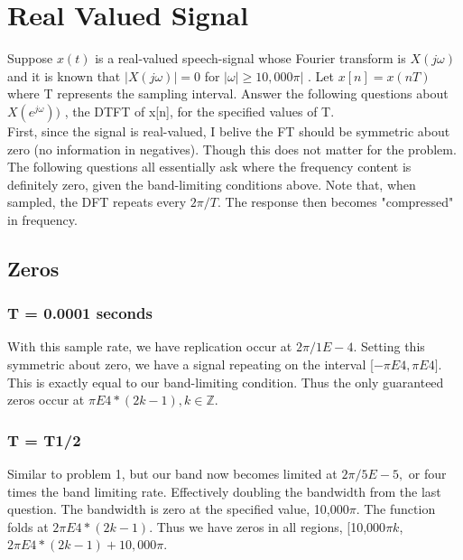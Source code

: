 

\maketitle
\section{Real Valued Signal}
Suppose	 $x(t)$ is	a	 real-valued	speech-signal	whose	Fourier	 transform	is	 $X ( j\omega)$ and	it	is	 known	 that	$| X ( j\omega)|= 0$ for	$|\omega | \geq 10,000\pi|$ .	 Let	 $x[n] = x(nT )$ where	 T	 represents	the	 sampling	 interval.	 Answer	 the	 following	 questions	 about	 $X (e^{j\omega}) )$ ,	 the	 DTFT	 of	 x[n],	for	the	specified	values	of	T.\\[0.1in]
First, since the signal is real-valued, I belive the FT should be symmetric about zero (no information in negatives). Though this does not matter for the problem. \\[0.1in]
The following questions all essentially ask where the frequency content is definitely zero, given the band-limiting conditions above. Note that, when sampled, the DFT repeats every $2\pi/T$. The response then becomes "compressed" in frequency. 
\subsection{Zeros}
\subsubsection{T = 0.0001 seconds}	
With this sample rate, we have replication occur at $2\pi / 1E-4$. Setting this symmetric about zero, we have a signal repeating on the interval [$-\pi E4, \pi E4].$ This is exactly equal to our band-limiting condition. Thus the only guaranteed zeros occur at $\pi E4*(2k - 1), k \in \mathbb{Z}$. 
\subsubsection{T = T1/2}

Similar to problem 1, but our band now becomes limited at $2\pi / 5E-5,$ or four times the band limiting rate. Effectively doubling the bandwidth from the last question. The bandwidth is zero at the specified value, 10,000$\pi$. The function folds at $2\pi E4*(2k - 1)$. Thus we have zeros in all regions, [10,000$\pi k$, $2\pi E4*(2k - 1) + 10,000\pi$.
